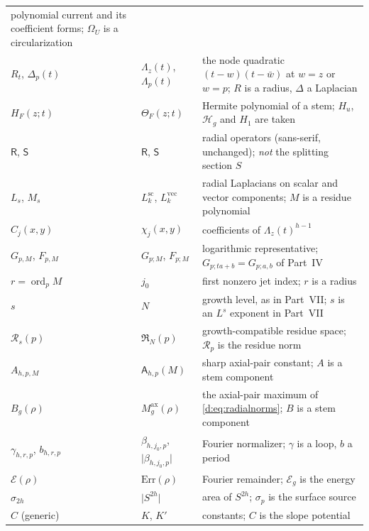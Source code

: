 \documentclass[11pt,a4paper]{article}
\numberwithin{equation}{section}
\theoremstyle{definition}
\theoremstyle{remark}
\theoremstyle{plain}
\newcommand{\Om}{\Omega}
\newcommand{\Rp}{\mathcal R_{p}}      %
\newcommand{\Hg}{\mathcal H_{g}}      %
\newcommand{\Max}{M^{\mathrm{ax}}}                    %
\newcommand{\Eg}{\mathcal E_{g}}
\newcommand{\abs}[1]{\lvert #1\rvert}
\newcommand{\Herm}{\Theta}                        %
\newcommand{\Rq}{\Lambda}                         %
\newcommand{\Rfilt}{\mathfrak R}                  %
\DeclareMathOperator{\ord}{ord}
\begin{document}
{\begin{longtable}{@{}p{}p{}p{}@{}}
 polynomial current and its coefficient forms; $\Om_U$ is a
 circularization\\
$R_t$, $\Delta_p(t)$ & $\Rq_z(t)$, $\Rq_p(t)$ & the node quadratic
 $(t-w)(t-\bar w)$ at $w=z$ or $w=p$; $R$ is a radius, $\Delta$ a
 Laplacian\\
$H_F(z;t)$ & $\Herm_F(z;t)$ & Hermite polynomial of a stem; $H_u$, $\Hg$ and
 $H_1$ are taken\\
$\mathsf R$, $\mathsf S$ & $\mathsf R$, $\mathsf S$ & radial operators
 (sans-serif, unchanged); \emph{not} the splitting section $S$\\
$L_s$, $M_s$ & $L^{\mathrm{sc}}_k$, $L^{\mathrm{vec}}_k$ & radial Laplacians
 on scalar and vector components; $M$ is a residue polynomial\\
$C_j(x,y)$ & $\chi_j(x,y)$ & coefficients of $\Rq_z(t)^{h-1}$\\
$G_{p,M}$, $F_{p,M}$ & $G_{p;M}$, $F_{p;M}$ & logarithmic representative;
 $G_{p;ta+b}=G_{p;a,b}$ of Part~IV\\
$r=\ord_pM$ & $j_0$ & first nonzero jet index; $r$ is a radius\\
$s$ & $N$ & growth level, as in Part~VII; $s$ is an $L^s$ exponent in
 Part~VII\\
$\mathcal R_s(p)$ & $\Rfilt_N(p)$ & growth-compatible residue space;
 $\Rp$ is the residue norm\\
$A_{h,p,M}$ & $\mathsf A_{h,p}(M)$ & sharp axial-pair constant; $A$ is a stem
 component\\
$B_g(\rho)$ & $\Max_g(\rho)$ & the axial-pair maximum of
 \eqref{d:eq:radialnorms}; $B$ is a stem component\\
$\gamma_{h,r,p}$, $b_{h,r,p}$ & $\beta_{h,j_0,p}$, $\abs{\beta_{h,j_0,p}}$ &
 Fourier normalizer; $\gamma$ is a loop, $b$ a period\\
$\mathcal E(\rho)$ & $\mathrm{Err}(\rho)$ & Fourier remainder; $\Eg$ is the
 energy\\
$\sigma_{2h}$ & $\abs{S^{2h}}$ & area of $S^{2h}$; $\sigma_p$ is the surface
 source\\
$C$ (generic) & $K$, $K'$ & constants; $C$ is the slope potential\\
\bottomrule
\end{longtable}}
\end{document}
